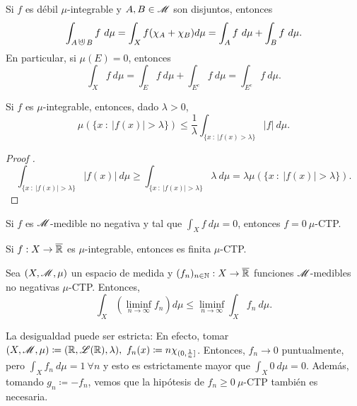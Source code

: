 
\begin{remark}
	Si $f$ es débil $\mu$-integrable y $A,B \in \mathscr{M}$ son disjuntos, entonces 
	\[ \int_{A \cupd B} f \ d\mu = \int_{X} f (\chi_{A} + \chi_{B})d\mu = \int_{A} f \ d\mu + \int_{B} f \ d\mu. \]
	En particular, si $\mu(E) = 0$, entonces
	\[ \int_{X} f \ d\mu = \int_{E} f \ d\mu + \int_{E^{c}} f \ d\mu = \int_{E^{c}} f \ d\mu. \]
\end{remark}

\begin{property}
	Si $f$ es $\mu$-integrable, entonces, dado $\lambda > 0$,
	\[ \mu(\{x \ : \ |f(x)| > \lambda\}) \leq \frac{1}{\lambda} \int_{\{x \ : \ |f(x) > \lambda\}} |f| \ d\mu. \] 
\end{property}
\begin{proof}[Proof ]
	\[ \int_{\{x \ : \ |f(x)| > \lambda\}} |f(x)| \ d\mu \geq \int_{\{x \ : \ |f(x)| > \lambda\}} \lambda \ d\mu = \lambda \mu(\{x \ : \ |f(x)| > \lambda\}). \]
\end{proof}

\begin{corollary}
	Si $f$ es $\mathscr{M}$-medible no negativa y tal que $\int_{X} f \ d\mu = 0$, entonces $f = 0 \ \mu$-CTP.
\end{corollary}

\begin{corollary}
	Si $f : X \to \overline{\mathbb{R}}$ es $\mu$-integrable, entonces es finita $\mu$-CTP.
\end{corollary}

\begin{lemma}[Fatou]
	Sea $(X, \mathscr{M}, \mu)$ un espacio de medida y $(f_{n})_{n \in \mathbb{N}} : X \to \overline{\mathbb{R}}$ funciones $\mathscr{M}$-medibles no negativas $\mu$-CTP. Entonces,
	\[ \int_{X} \left( \liminf_{n \to \infty} f_{n} \right) d\mu \leq \liminf_{n \to \infty} \int_{X} f_{n} \ d\mu. \]
\end{lemma}

\begin{remark}
	La desigualdad puede ser estricta: En efecto, tomar $(X, \mathscr{M}, \mu) \coloneq (\mathbb{R}, \mathscr{L}(\mathbb{R}), \lambda),\ f_{n}(x) \coloneq n \chi_{(0,\frac{1}{n}]}$. Entonces, $f_{n} \longrightarrow 0$ puntualmente, pero $\int_{X} f_{n} \ d\mu = 1 \ \forall n$ y esto es estrictamente mayor que $\int_{X} 0 \ d\mu = 0$. Además, tomando $g_{n} \coloneq -f_{n}$, vemos que la hipótesis de $f_{n} \geq 0 \ \mu$-CTP también es necesaria.
\end{remark}

